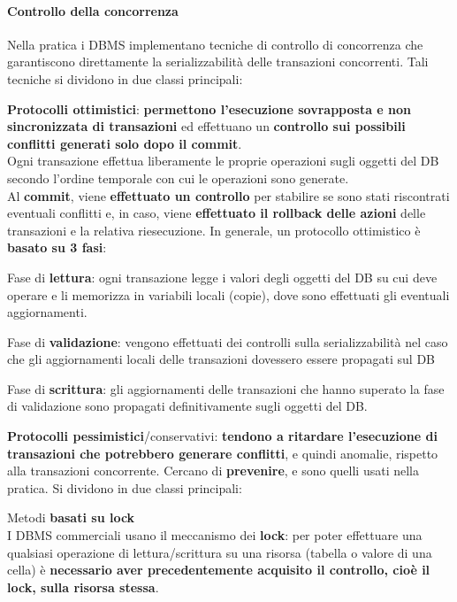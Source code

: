 \documentclass[10pt]{book}
\begin{document}
\paragraph{Controllo della concorrenza} Nella pratica i DBMS implementano tecniche di controllo di concorrenza che garantiscono direttamente la serializzabilità delle transazioni concorrenti. Tali tecniche si dividono in due classi principali:
\begin{list}{}{}
	\item \textbf{Protocolli ottimistici}: \textbf{permettono l'esecuzione sovrapposta e non sincronizzata di transazioni} ed effettuano un \textbf{controllo sui possibili conflitti generati solo dopo il commit}.\\
	Ogni transazione effettua liberamente le proprie operazioni sugli oggetti del DB secondo l'ordine temporale con cui le operazioni sono generate.\\
	Al \textbf{commit}, viene \textbf{effettuato un controllo} per stabilire se sono stati riscontrati eventuali conflitti e, in caso, viene \textbf{effettuato il rollback delle azioni} delle transazioni e la relativa riesecuzione. In generale, un protocollo ottimistico è \textbf{basato su 3 fasi}:
	\begin{list}{}{}
		\item Fase di \textbf{lettura}: ogni transazione legge i valori degli oggetti del DB su cui deve operare e li memorizza in variabili locali (copie), dove sono effettuati gli eventuali aggiornamenti.
		\item Fase di \textbf{validazione}: vengono effettuati dei controlli sulla serializzabilità nel caso che gli aggiornamenti locali delle transazioni dovessero essere propagati sul DB
		\item Fase di \textbf{scrittura}: gli aggiornamenti delle transazioni che hanno superato la fase di validazione sono propagati definitivamente sugli oggetti del DB.
	\end{list}
	\item \textbf{Protocolli pessimistici}/conservativi: \textbf{tendono a ritardare l'esecuzione di transazioni che potrebbero generare conflitti}, e quindi anomalie, rispetto alla transazioni concorrente. Cercano di \textbf{prevenire}, e sono quelli usati nella pratica. Si dividono in due classi principali:
	\begin{list}{}{}
		\item Metodi \textbf{basati su lock}\\
		I DBMS commerciali usano il meccanismo dei \textbf{lock}: per poter effettuare una qualsiasi operazione di lettura/scrittura su una risorsa (tabella o valore di una cella) è \textbf{necessario aver precedentemente acquisito il controllo, cioè il lock, sulla risorsa stessa}.

\end{list}
\end{list}
\end{document}

